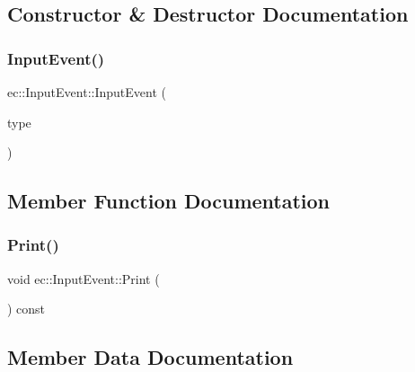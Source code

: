 \subsection{Constructor \& Destructor Documentation}
\mbox{\label{structec_1_1_input_event_ae7dd00fad1ba770de42ba5b7e977bc79}} 
\subsubsection{\texorpdfstring{Input\+Event()}{InputEvent()}}
{\footnotesize\ttfamily ec\+::\+Input\+Event\+::\+Input\+Event (\begin{DoxyParamCaption}\item[{const \mbox{\hyperlink{namespaceec_a5de6bdb8c4b2ed6e590e721ec998f964}{Input\+Type}}}]{type }\end{DoxyParamCaption})\hspace{0.3cm}{\ttfamily [explicit]}}



\subsection{Member Function Documentation}
\mbox{\label{structec_1_1_input_event_a1ecc94cf2e36938b8bfc1c413de6ba04}} 
\subsubsection{\texorpdfstring{Print()}{Print()}}
{\footnotesize\ttfamily void ec\+::\+Input\+Event\+::\+Print (\begin{DoxyParamCaption}{ }\end{DoxyParamCaption}) const}



\subsection{Member Data Documentation}
\mbox{\label{structec_1_1_input_event_a8d146eaa61615d0e9f680f68d920835c}} 
